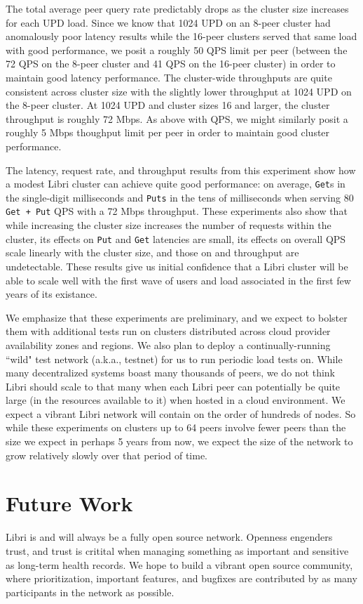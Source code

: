 \documentclass[10pt]{article}
\newcommand{\ttt}[1]{\texttt{#1}}
\begin{document}
The total average peer query rate predictably drops as the cluster size increases for each UPD load. Since we know that 1024 UPD on an 8-peer cluster had anomalously poor latency results while the 16-peer clusters served that same load with good performance, we posit a roughly 50 QPS limit per peer (between the 72 QPS on the 8-peer cluster and 41 QPS on the 16-peer cluster) in order to maintain good latency performance. The cluster-wide throughputs are quite consistent across cluster size with the slightly lower throughput at 1024 UPD on the 8-peer cluster. At 1024 UPD and cluster sizes 16 and larger, the cluster throughput is roughly 72 Mbps. As above with QPS, we might similarly posit a roughly 5 Mbps thoughput limit per peer in order to maintain good cluster performance.

The latency, request rate, and throughput results from this experiment show how a modest Libri cluster can achieve quite good performance: on average, \ttt{Get}s in the single-digit milliseconds and \texttt{Puts} in the tens of milliseconds when serving 80 \texttt{Get + Put} QPS with a 72 Mbps throughput. These experiments also show that while increasing the cluster size increases the number of requests within the cluster, its effects on \texttt{Put} and \texttt{Get} latencies are small, its effects on overall QPS scale linearly with the cluster size, and those on and throughput are undetectable. These results give us initial confidence that a Libri cluster will be able to scale well with the first wave of users and load associated in the first few years of its existance.

We emphasize that these experiments are preliminary, and we expect to bolster them with additional tests run on clusters distributed across cloud provider availability zones and regions. We also plan to deploy a continually-running ``wild" test network (a.k.a., testnet) for us to run periodic load tests on. While many decentralized systems boast many thousands of peers, we do not think Libri should scale to that many when each Libri peer can potentially be quite large (in the resources available to it) when hosted in a cloud environment. We expect a vibrant Libri network will contain on the order of hundreds of nodes. So while these experiments on clusters up to 64 peers involve fewer peers than the size we expect in perhaps 5 years from now, we expect the size of the network to grow relatively slowly over that period of time.


\section{Future Work}
\label{sec:future}
Libri is and will always be a fully open source network. Openness engenders trust, and trust is critital when managing something as important and sensitive as long-term health records. We hope to build a vibrant open source community, where prioritization, important features, and bugfixes are contributed by as many participants in the network as possible. 
\end{document}
